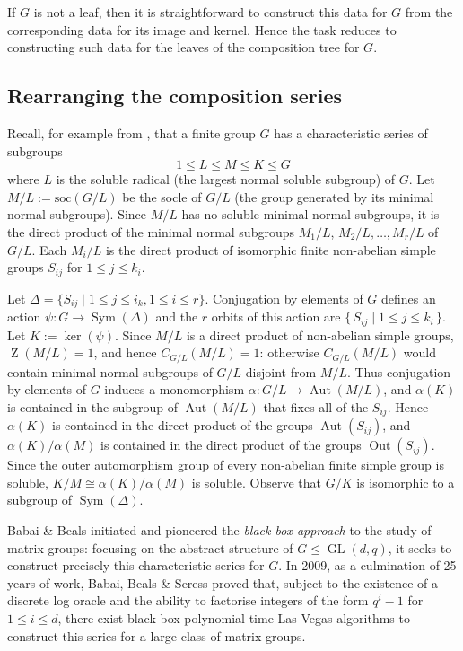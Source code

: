 \documentclass[12pt,twoside,reqno,psamsfonts]{amsproc}
\numberwithin{equation}{section}
\numberwithin{figure}{section}
\newcounter{algorithm}
\theoremstyle{plain}
\theoremstyle{definition}
\theoremstyle{remark}
\providecommand{\Sym}[1]{\operatorname{Sym}( #1 )}
\newcommand{\soc}{\mathrm{soc}}
\DeclareMathOperator{\GL}{GL}
\DeclareMathOperator{\Aut}{Aut}
\DeclareMathOperator{\Out}{Out}
\DeclareMathOperator{\Zent}{Z}
\begin{document}
If $G$ is not a leaf, then it is straightforward to construct
this data for $G$ from the corresponding data for its image and kernel. 
Hence the task reduces to constructing such data for the leaves of the
composition tree for $G$. 

\subsection{Rearranging the composition series}
\label{section:charsubs}
Recall, for example from  \cite[\S 10.1]{hcgt}, 
that a finite group $G$ has a characteristic series of subgroups
$$1 \leqslant L \leqslant M \leqslant  K \leqslant G$$
where $L$ is the soluble radical (the 
largest normal soluble subgroup) of $G$.
Let $M/L := \soc(G/L)$ be the socle of $G/L$
(the group generated by its minimal normal subgroups).
Since $M/L$ has no soluble minimal normal subgroups,
it is the direct product
of the minimal normal subgroups $M_1/L$, $M_2/L, \ldots, M_r/L$ of $G/L$.
Each $M_i/L$ is the direct product of
isomorphic finite non-abelian simple groups 
$S_{ij}$ for $1 \leqslant j \leqslant k_i$.

Let $\Delta = \{ S_{ij} \mid 1 \leqslant j \leqslant i_k, 1 \leqslant i \leqslant r \}$.
Conjugation by elements of $G$ defines an action $\psi:G \to
\Sym{\Delta}$ and the $r$ orbits of this action are 
$\{\,S_{ij}\mid 1 \leqslant j \leqslant k_i\,\}$. 
Let  $K := \ker(\psi)$. Since $M/L$ is a direct product of non-abelian
simple groups, $\Zent(M/L) = 1$, and hence $C_{G/L}(M/L) = 1$:
otherwise $C_{G/L}(M/L)$ would contain minimal normal subgroups
of $G/L$ disjoint from $M/L$. Thus conjugation by elements of $G$ 
induces a
monomorphism $\alpha:G/L \to \Aut(M/L)$, and $\alpha(K)$ is contained
in the subgroup of $\Aut(M/L)$ that fixes all of the $S_{ij}$. Hence
$\alpha(K)$ is contained in the direct product of the groups
$\Aut(S_{ij})$, and $\alpha(K)/\alpha(M)$ is contained in the
direct product of the groups $\Out(S_{ij})$.
Since the outer automorphism group
of every non-abelian finite simple group is soluble, 
$K/M \cong \alpha(K)/\alpha(M)$ is soluble.
Observe that $G/K$ is isomorphic to a subgroup of
$\Sym{\Delta}$.

Babai \& Beals \cite{babaibeals99} initiated
and pioneered the {\em black-box approach}
to the study of matrix groups: focusing on the 
abstract structure of $G \leqslant \GL(d, q)$, it seeks to construct
precisely this characteristic series for $G$. 
In 2009, as a culmination of 25 years of work,
Babai, Beals \& Seress \cite{BBS} proved that,
subject to the existence of a discrete
log oracle and the ability to factorise integers
of the form $q^i - 1$ for $1 \leqslant i \leqslant d$,
there exist black-box polynomial-time Las Vegas algorithms
to construct this series for a large class of matrix groups.
\end{document}
